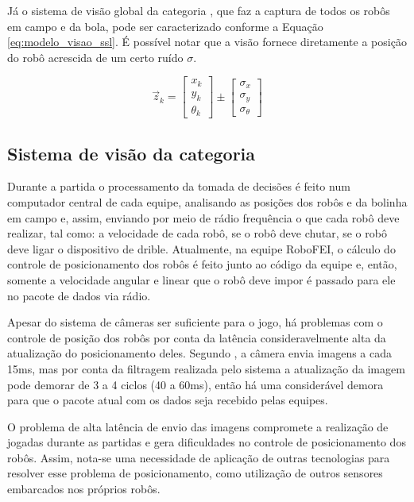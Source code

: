 \documentclass[acronym, symbols, table]{fei}
\begin{document}
		Já o sistema de visão global da categoria , que faz a captura de todos os robôs em campo e da bola, pode ser caracterizado conforme a Equação \ref{eq:modelo_visao_ssl}. É possível notar que a visão fornece diretamente a posição do robô acrescida de um certo ruído $\sigma$.
		
		\begin{equation}\label{eq:modelo_visao_ssl}
			\overrightarrow{z}_k  = 
			\begin{bmatrix}
				x_k \\
				y_k \\
				\theta_k
			\end{bmatrix} \pm
			\begin{bmatrix}
				\sigma_x \\
				\sigma_y \\
				\sigma_{\theta}
			\end{bmatrix}
		\end{equation}
		
		\subsection{Sistema de visão da categoria }
		
			Durante a partida o processamento da tomada de decisões é feito num computador central de cada equipe, analisando as posições dos robôs e da bolinha em campo e, assim, enviando por meio de rádio frequência o que cada robô deve realizar, tal como: a velocidade de cada robô, se o robô deve chutar, se o robô deve ligar o dispositivo de drible. Atualmente, na equipe RoboFEI, o cálculo do controle de posicionamento dos robôs é feito junto ao código da equipe e, então, somente a velocidade angular e linear que o robô deve impor é passado para ele no pacote de dados via rádio.
		
			Apesar do sistema de câmeras ser suficiente para o jogo, há problemas com o controle de posição dos robôs por conta da latência consideravelmente alta da atualização do posicionamento deles. Segundo \textcite{tdpZJUNlict2020}, a câmera envia imagens a cada 15ms, mas por conta da filtragem realizada pelo sistema a atualização da imagem pode demorar de 3 a 4 ciclos (40 a 60ms), então há uma considerável demora para que o pacote atual com os dados seja recebido pelas equipes.
			
			O problema de alta latência de envio das imagens compromete a realização de jogadas durante as partidas e gera dificuldades no controle de posicionamento dos robôs. Assim, nota-se uma necessidade de aplicação de outras tecnologias para resolver esse problema de posicionamento, como utilização de outros sensores embarcados nos próprios robôs.
			
\end{document}
